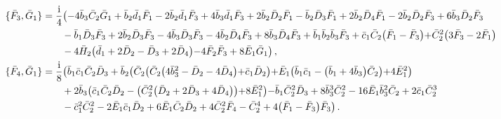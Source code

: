 \documentclass[10pt]{amsart}
\theoremstyle{definition}
\theoremstyle{corollary}
\theoremstyle{remark}
\theoremstyle{conclusion}
\begin{document}
\begin{align}
\{\bar{F}_3, \bar{G}_1\}&=\frac{\rm i}{4} \bigl(-4 \bar{b}_3 \bar{C}_2 \bar{G}_1+\bar{b}_2 \bar{d}_1 \bar{F}_1-2 \bar{b}_2 \bar{d}_1 \bar{F}_3+4 \bar{b}_3 \bar{d}_1 \bar{F}_3+2 \bar{b}_2 \bar{D}_2 \bar{F}_1-\bar{b}_2 \bar{D}_3 \bar{F}_1+2 \bar{b}_2 \bar{D}_4 \bar{F}_1-2 \bar{b}_2 \bar{D}_2 \bar{F}_3+6 \bar{b}_3 \bar{D}_2 \bar{F}_3 \nonumber\\
&	\hskip 0.7cm-\bar{b}_1 \bar{D}_3 \bar{F}_3+2 \bar{b}_2 \bar{D}_3 \bar{F}_3-4 \bar{b}_3 \bar{D}_3 \bar{F}_3-4 \bar{b}_2 \bar{D}_4 \bar{F}_3+8 \bar{b}_3 \bar{D}_4 \bar{F}_3+\bar{b}_1 \bar{b}_2 \bar{b}_3 \bar{F}_3+\bar{c}_1 \bar{C}_2 \bigl(\bar{F}_1-\bar{F}_3\bigl)+\bar{C}_2^2 \bigl(3 \bar{F}_3-2 \bar{F}_1\bigl) \nonumber\\
&	\hskip 0.7cm-4 \bar{H}_2 \bigl(\bar{d}_1+2 \bar{D}_2-\bar{D}_3+2 \bar{D}_4\bigl)-4 \bar{F}_2 \bar{F}_3+8 \bar{E}_1 \bar{G}_1\bigl) \, ,\nonumber\\
\{\bar{F}_4, \bar{G}_1\}&=\frac{\rm i}{8}  \bigl(\bar{b}_1 \bar{c}_1 \bar{C}_2 \bar{D}_3+\bar{b}_2 \bigl(\bar{C}_2 \bigl(\bar{C}_2 \bigl(4 \bar{b}_3^2-\bar{D}_2-4 \bar{D}_4\bigl)+\bar{c}_1 \bar{D}_2\bigl)+\bar{E}_1 \bigl(\bar{b}_1 \bar{c}_1-\bigl(\bar{b}_1+4 \bar{b}_3\bigl) \bar{C}_2\bigl)+4 \bar{E}_1^2\bigl)\nonumber\\
&	\hskip 0.7cm+2 \bar{b}_3 \bigl(\bar{c}_1 \bar{C}_2 \bar{D}_2-\bigl(\bar{C}_2^2 \bigl(\bar{D}_2+2 \bar{D}_3+4 \bar{D}_4\bigl)\bigl)+8 \bar{E}_1^2\bigl)-\bar{b}_1 \bar{C}_2^2 \bar{D}_3+8 \bar{b}_3^3 \bar{C}_2^2-16 \bar{E}_1 \bar{b}_3^2 \bar{C}_2+2 \bar{c}_1 \bar{C}_2^3\nonumber\\
&	\hskip 0.7cm-\bar{c}_1^2 \bar{C}_2^2-2 \bar{E}_1 \bar{c}_1 \bar{D}_2+6 \bar{E}_1 \bar{C}_2 \bar{D}_2+4 \bar{C}_2^2 \bar{F}_4-\bar{C}_2^4+4 \bigl(\bar{F}_1-\bar{F}_3\bigl) \bar{F}_3\bigl) \, .
\end{align} 
\end{document}

